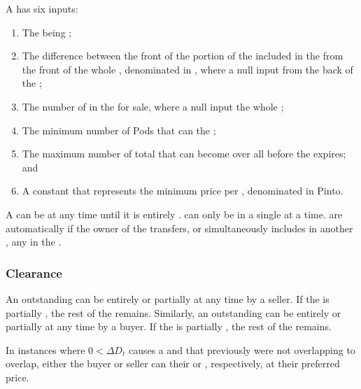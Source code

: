 \documentclass[class=article, crop=false]{standalone}
\begin{document}
A  has six inputs: 

\begin{enumerate}
    \item The  being ;
    \item The difference between the front of the portion of the  included in the  from the front of the whole , denominated in , where a null input  from the back of the ;
    \item The number of  in the  for sale, where a null input  the whole ;
    \item The minimum number of Pods that can  the ; 
    \item The maximum number of total  that can become  over all  before the  expires; and
    \item A constant that represents the minimum price per , denominated in Pinto.
\end{enumerate}

A  can be  at any time until it is entirely .  can only be  in a single  at a time.  are automatically  if the owner of the  transfers, or simultaneously includes in another , any  in the .


\subsubsection{Clearance}

An outstanding  can be entirely or partially  at any time by a  seller. If the  is partially , the rest of the  remains. Similarly, an outstanding  can be entirely or partially  at any time by a  buyer. If the  is partially , the rest of the  remains.

In instances where $0 < \Delta D_t$ causes a  and  that previously were not overlapping to overlap, either the buyer or seller can  their  or , respectively, at their preferred price. 
\end{document}
